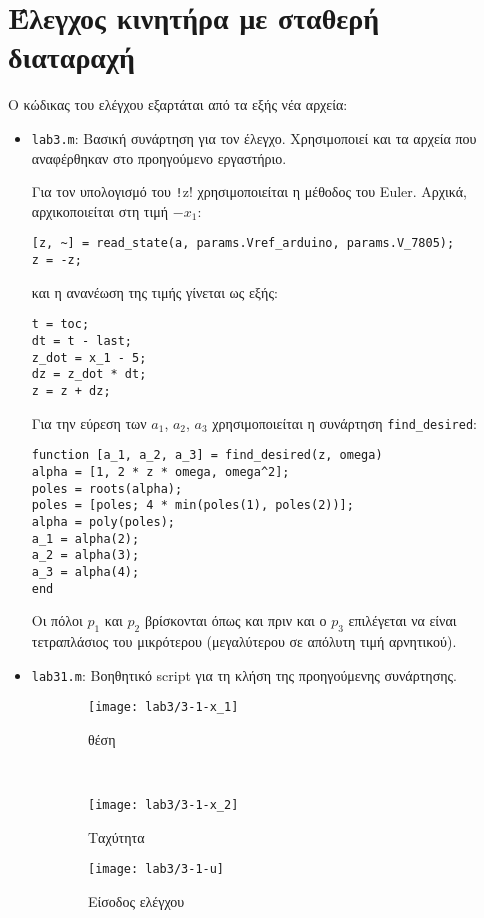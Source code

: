 \section{Έλεγχος κινητήρα με σταθερή διαταραχή}
Ο κώδικας του ελέγχου εξαρτάται από τα εξής νέα αρχεία:
\begin{itemize}
\item \texttt{lab3.m}: Βασική συνάρτηση για τον έλεγχο.
  Χρησιμοποιεί και τα αρχεία που αναφέρθηκαν στο προηγούμενο εργαστήριο.

  Για τον υπολογισμό του \texttt!z! χρησιμοποιείται η μέθοδος του Euler.
  Αρχικά, αρχικοποιείται στη τιμή $-x_1$:
  \begin{code}
\begin{verbatim}
[z, ~] = read_state(a, params.Vref_arduino, params.V_7805);
z = -z;
\end{verbatim}
  \end{code}
  και η ανανέωση της τιμής γίνεται ως εξής:
  \begin{code}
\begin{verbatim}
t = toc;
dt = t - last;
z_dot = x_1 - 5;
dz = z_dot * dt;
z = z + dz;
\end{verbatim}
  \end{code}

  Για την εύρεση των $a_1$, $a_2$, $a_3$ χρησιμοποιείται η συνάρτηση \texttt{find_desired}:
  \begin{code}
\begin{verbatim}
function [a_1, a_2, a_3] = find_desired(z, omega)
alpha = [1, 2 * z * omega, omega^2];
poles = roots(alpha);
poles = [poles; 4 * min(poles(1), poles(2))];
alpha = poly(poles);
a_1 = alpha(2);
a_2 = alpha(3);
a_3 = alpha(4);
end
\end{verbatim}
  \end{code}
  Οι πόλοι $p_1$ και $p_2$ βρίσκονται όπως και πριν και ο $p_3$ επιλέγεται να είναι τετραπλάσιος του μικρότερου
  (μεγαλύτερου σε απόλυτη τιμή αρνητικού).

  \item \texttt{lab31.m}: Βοηθητικό script για τη κλήση της προηγούμενης συνάρτησης.
\end{itemize}

\begin{figure}[htbp]
  \centering
  \begin{subfigure}[t]{\linewidth}
    \texttt{[image: lab3/3-1-x\_1]}
    \caption{θέση}
    \label{fig:3-1-x_1}
  \end{subfigure}\\
  \begin{subfigure}[t]{0.45\linewidth}
    \texttt{[image: lab3/3-1-x\_2]}
    \caption{Ταχύτητα}
    \label{fig:3-1-x_2}
  \end{subfigure}\hfill
  \begin{subfigure}[t]{0.45\linewidth}
    \texttt{[image: lab3/3-1-u]}
    \caption{Είσοδος ελέγχου}
    \label{fig:3-1-u}
  \end{subfigure}
  \caption[]{}
  \label{fig:3-1}
\end{figure}

